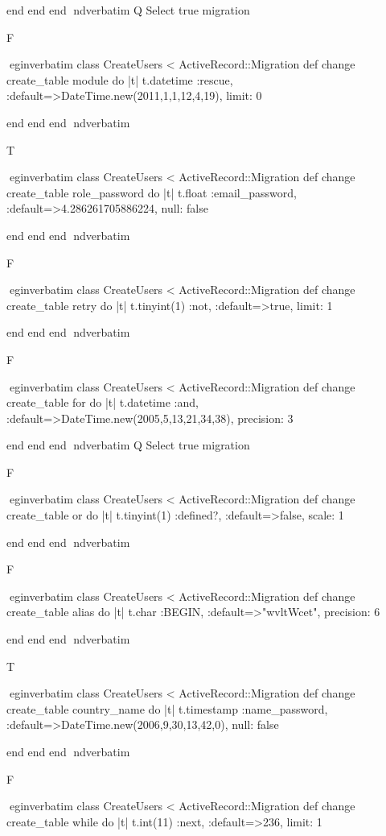     end 
  end 
end
nd{verbatim}
Q
 Select true migration

F

egin{verbatim}
 class CreateUsers < ActiveRecord::Migration 
  def change 
    create_table module do |t| 
      t.datetime :rescue, :default=>DateTime.new(2011,1,1,12,4,19), limit: 0
    
    end 
  end 
end
nd{verbatim}

T

egin{verbatim}
 class CreateUsers < ActiveRecord::Migration 
  def change 
    create_table role_password do |t| 
      t.float :email_password, :default=>4.286261705886224, null: false
    
    end 
  end 
end
nd{verbatim}

F

egin{verbatim}
 class CreateUsers < ActiveRecord::Migration 
  def change 
    create_table retry do |t| 
      t.tinyint(1) :not, :default=>true, limit: 1
    
    end 
  end 
end
nd{verbatim}

F

egin{verbatim}
 class CreateUsers < ActiveRecord::Migration 
  def change 
    create_table for do |t| 
      t.datetime :and, :default=>DateTime.new(2005,5,13,21,34,38), precision: 3
    
    end 
  end 
end
nd{verbatim}
Q
 Select true migration

F

egin{verbatim}
 class CreateUsers < ActiveRecord::Migration 
  def change 
    create_table or do |t| 
      t.tinyint(1) :defined?, :default=>false, scale: 1
    
    end 
  end 
end
nd{verbatim}

F

egin{verbatim}
 class CreateUsers < ActiveRecord::Migration 
  def change 
    create_table alias do |t| 
      t.char :BEGIN, :default=>"wvltWcet", precision: 6
    
    end 
  end 
end
nd{verbatim}

T

egin{verbatim}
 class CreateUsers < ActiveRecord::Migration 
  def change 
    create_table country_name do |t| 
      t.timestamp :name_password, :default=>DateTime.new(2006,9,30,13,42,0), null: false
    
    end 
  end 
end
nd{verbatim}

F

egin{verbatim}
 class CreateUsers < ActiveRecord::Migration 
  def change 
    create_table while do |t| 
      t.int(11) :next, :default=>236, limit: 1
    

